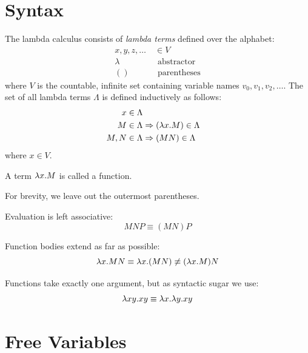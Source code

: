 \section{Syntax}
\begin{definition}
	The lambda calculus consists of \emph{lambda terms} defined over the alphabet:
	\begin{align*}
		x,y,z,\hdots\ &\in V\\
		\lambda\ &\text{ abstractor} \\
		()\ &\text{ parentheses}
	\end{align*}
	where $V$ is the countable, infinite set containing variable names $v_0,v_1,v_2,\hdots$.
	The set of all lambda terms $\Lambda$ is defined inductively as follows:
	\label{def:grammar}
	\begin{align*}
		x\in\Lambda \\
		M\in\Lambda &\Rightarrow (\lambda x.M)\in\Lambda \\
		M, N\in\Lambda &\Rightarrow (M N)\in\Lambda
	\end{align*}
where $x\in V$.
\end{definition}
\begin{convention}
	A term $\lambda x.M$ is called a function.
\end{convention}
\begin{convention}
	For brevity, we leave out the outermost parentheses.
\end{convention}
\begin{convention}\label{con:assoc}
	Evaluation is left associative:
	\begin{equation*}
		M N P \equiv (M N) P
	\end{equation*}
\end{convention}
\begin{convention}\label{con:extent}
	Function bodies extend as far as possible:
	\begin{equation*}
		\lambda x.M N\equiv\lambda x.(M N)\not\equiv(\lambda x.M)N
	\end{equation*}
\end{convention}
\begin{convention}
	Functions take exactly one argument, but as syntactic sugar we use:
	\begin{equation*}
		\lambda xy.xy\equiv\lambda x.\lambda y.xy
	\end{equation*}
\end{convention}

\section{Free Variables}

